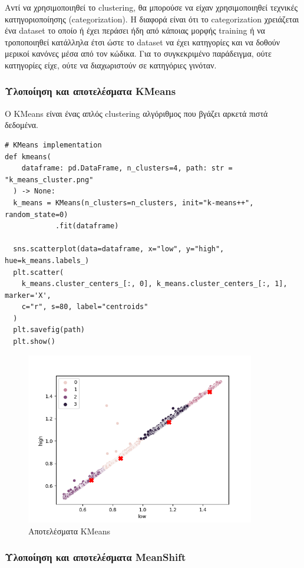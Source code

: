 Αντί να χρησιμοποιηθεί το clustering, θα μπορούσε να είχαν χρησιμοποιηθεί τεχνικές κατηγοριοποίησης (categorization). Η διαφορά είναι ότι το categorization χρειάζεται ένα dataset το οποίο ή έχει περάσει ήδη από κάποιας μορφής training ή να τροποποιηθεί κατάλληλα έτσι ώστε το dataset να έχει κατηγορίες και να δοθούν μερικοί κανόνες μέσα από τον κώδικα. Για το συγκεκριμένο παράδειγμα, ούτε κατηγορίες είχε, ούτε να διαχωριστούν σε κατηγόριες γινόταν.

\subsubsection{Υλοποίηση και αποτελέσματα KMeans}

Ο KMeans είναι ένας απλός clustering αλγόριθμος που βγάζει αρκετά πιστά δεδομένα.

\begin{verbatim}
# KMeans implementation
def kmeans(
    dataframe: pd.DataFrame, n_clusters=4, path: str = "k_means_cluster.png"
  ) -> None:
  k_means = KMeans(n_clusters=n_clusters, init="k-means++", random_state=0)
            .fit(dataframe)

  sns.scatterplot(data=dataframe, x="low", y="high", hue=k_means.labels_)
  plt.scatter(
    k_means.cluster_centers_[:, 0], k_means.cluster_centers_[:, 1], marker='X',
    c="r", s=80, label="centroids"
  )
  plt.savefig(path)
  plt.show()
\end{verbatim}

\begin{figure}[H]
  \centering
  \includegraphics[width=100mm]{Figures/k_means_cluster.png}
  \caption{Αποτελέσματα KMeans}
  \label{fig:k_means}
\end{figure}

\subsubsection{Υλοποίηση και αποτελέσματα MeanShift}

